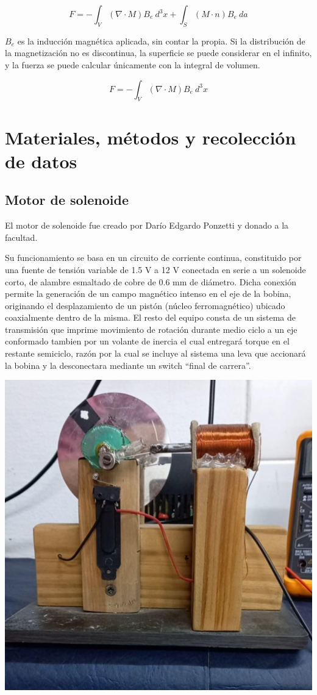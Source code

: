 \documentclass[a4paper,12pt]{article}
\newenvironment{Figure}
    {\par\medskip\noindent\minipage{\linewidth}}
    {\endminipage\par\medskip}
\begin{document}
        \begin{equation}
            \label{eq: fuerzaMagnetica}
            F = - \int_{V}^{} (\nabla \cdot M) B_e \ d^3 x + \int_{S}^{} (M \cdot n) B_e \ da
        \end{equation}

        $B_e$ es la inducción magnética aplicada, sin contar la propia. Si la distribución de la magnetización no es discontinua, la superficie se puede considerar en el infinito, y la fuerza se puede calcular únicamente con la integral de volumen.

        \begin{equation}
            \label{eq: fuerzaMagneticaReducida}
            F = - \int_{V}^{} (\nabla \cdot M) B_e \ d^3 x
        \end{equation}

\section*{Materiales, métodos y recolección de datos}

    \subsection*{Motor de solenoide}

        El motor de solenoide fue creado por Darío Edgardo Ponzetti y donado a la facultad.

        Su funcionamiento se basa en un circuito de corriente continua, constituido por una fuente de tensión variable de 1.5 V a 12 V conectada en serie a un solenoide corto, de alambre esmaltado de cobre de 0.6 mm de diámetro. Dicha conexión permite la generación de un campo magnético intenso en el eje de la bobina, originando el desplazamiento de un pistón (núcleo ferromagnético) ubicado coaxialmente dentro de la misma. El resto del equipo consta de un sistema de transmisión que imprime movimiento de rotación durante medio ciclo a un eje conformado tambien por un volante de inercia el cual entregará torque en el restante semiciclo, razón por la cual se incluye al sistema una leva que accionará la bobina y la desconectara mediante un switch “final de carrera”.

        \begin{Figure}
            \centering

            \includegraphics[width=0.4\linewidth]{motorSolenoide_frente.jpg}
            \label{fig: motorSolenoide_frente}

        \end{Figure}
        
\end{document}
